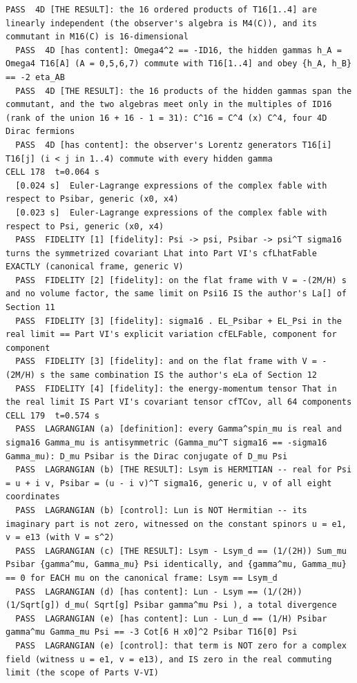 \begin{Verbatim}[fontsize=\scriptsize]
  PASS  4D [THE RESULT]: the 16 ordered products of T16[1..4] are linearly independent (the observer's algebra is M4(C)), and its commutant in M16(C) is 16-dimensional
  PASS  4D [has content]: Omega4^2 == -ID16, the hidden gammas h_A = Omega4 T16[A] (A = 0,5,6,7) commute with T16[1..4] and obey {h_A, h_B} == -2 eta_AB
  PASS  4D [THE RESULT]: the 16 products of the hidden gammas span the commutant, and the two algebras meet only in the multiples of ID16 (rank of the union 16 + 16 - 1 = 31): C^16 = C^4 (x) C^4, four 4D Dirac fermions
  PASS  4D [has content]: the observer's Lorentz generators T16[i] T16[j] (i < j in 1..4) commute with every hidden gamma
CELL 178  t=0.064 s
  [0.024 s]  Euler-Lagrange expressions of the complex fable with respect to Psibar, generic (x0, x4)
  [0.023 s]  Euler-Lagrange expressions of the complex fable with respect to Psi, generic (x0, x4)
  PASS  FIDELITY [1] [fidelity]: Psi -> psi, Psibar -> psi^T sigma16 turns the symmetrized covariant Lhat into Part VI's cfLhatFable EXACTLY (canonical frame, generic V)
  PASS  FIDELITY [2] [fidelity]: on the flat frame with V = -(2M/H) s and no volume factor, the same limit on Psi16 IS the author's La[] of Section 11
  PASS  FIDELITY [3] [fidelity]: sigma16 . EL_Psibar + EL_Psi in the real limit == Part VI's explicit variation cfELFable, component for component
  PASS  FIDELITY [3] [fidelity]: and on the flat frame with V = -(2M/H) s the same combination IS the author's eLa of Section 12
  PASS  FIDELITY [4] [fidelity]: the energy-momentum tensor That in the real limit IS Part VI's covariant tensor cfTCov, all 64 components
CELL 179  t=0.574 s
  PASS  LAGRANGIAN (a) [definition]: every Gamma^spin_mu is real and sigma16 Gamma_mu is antisymmetric (Gamma_mu^T sigma16 == -sigma16 Gamma_mu): D_mu Psibar is the Dirac conjugate of D_mu Psi
  PASS  LAGRANGIAN (b) [THE RESULT]: Lsym is HERMITIAN -- real for Psi = u + i v, Psibar = (u - i v)^T sigma16, generic u, v of all eight coordinates
  PASS  LAGRANGIAN (b) [control]: Lun is NOT Hermitian -- its imaginary part is not zero, witnessed on the constant spinors u = e1, v = e13 (with V = s^2)
  PASS  LAGRANGIAN (c) [THE RESULT]: Lsym - Lsym_d == (1/(2H)) Sum_mu Psibar {gamma^mu, Gamma_mu} Psi identically, and {gamma^mu, Gamma_mu} == 0 for EACH mu on the canonical frame: Lsym == Lsym_d
  PASS  LAGRANGIAN (d) [has content]: Lun - Lsym == (1/(2H)) (1/Sqrt[g]) d_mu( Sqrt[g] Psibar gamma^mu Psi ), a total divergence
  PASS  LAGRANGIAN (e) [has content]: Lun - Lun_d == (1/H) Psibar gamma^mu Gamma_mu Psi == -3 Cot[6 H x0]^2 Psibar T16[0] Psi
  PASS  LAGRANGIAN (e) [control]: that term is NOT zero for a complex field (witness u = e1, v = e13), and IS zero in the real commuting limit (the scope of Parts V-VI)

\end{Verbatim}
